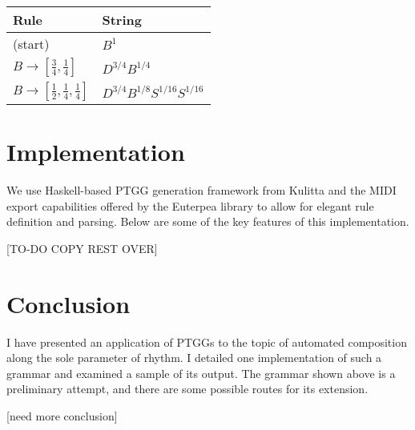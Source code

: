 \documentclass{article}
\begin{document}
\bgroup
\def\arraystretch{1.5}
\begin{center}
\begin{tabular}{ l l }
 Rule & String \\
 \hline
 (start) & $B^{1}$ \\
 $B \rightarrow [\frac{3}{4}, \frac{1}{4}]$              & $D^{3/4} B^{1/4}$ \\
 $B \rightarrow [\frac{1}{2}, \frac{1}{4}, \frac{1}{4}]$ & $D^{3/4} B^{1/8} S^{1/16} S^{1/16}$ \\
\end{tabular}
\end{center}
\egroup

\section{Implementation}

We use Haskell-based PTGG generation framework from Kulitta and the MIDI export capabilities offered by the Euterpea library \cite{euterpea} to allow for elegant rule definition and parsing. Below are some of the key features of this implementation.

[TO-DO COPY REST OVER]


\section{Conclusion}

I have presented an application of PTGGs to the topic of automated composition along the sole parameter of rhythm. I detailed one implementation of such a grammar and examined a sample of its output. The grammar shown above is a preliminary attempt, and there are some possible routes for its extension. 

[need more conclusion]
\end{document}
